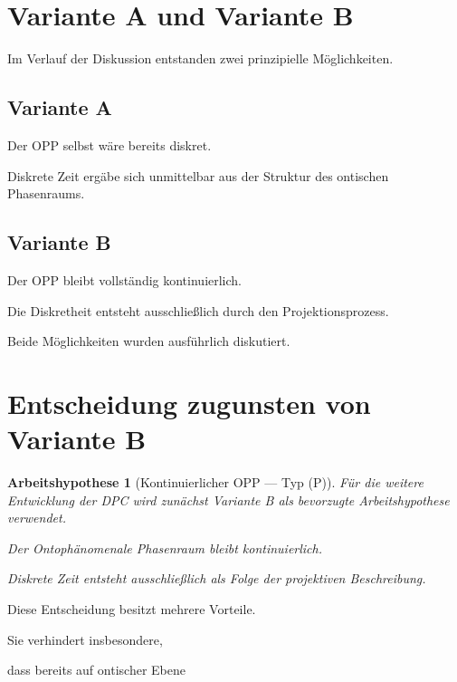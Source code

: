 \documentclass[11pt,a4paper]{article}
\newtheorem{hypothesis}{Arbeitshypothese}
\begin{document}
\section{Variante A und Variante B}

Im Verlauf der Diskussion entstanden zwei prinzipielle
Möglichkeiten.

\subsection*{Variante A}

Der OPP selbst wäre bereits diskret.

Diskrete Zeit ergäbe sich unmittelbar aus der Struktur
des ontischen Phasenraums.

\subsection*{Variante B}

Der OPP bleibt vollständig kontinuierlich.

Die Diskretheit entsteht ausschließlich durch den
Projektionsprozess.

Beide Möglichkeiten wurden ausführlich diskutiert.

\section{Entscheidung zugunsten von Variante B}

\begin{hypothesis}[Kontinuierlicher OPP --- Typ (P)]

Für die weitere Entwicklung der DPC wird zunächst
Variante B als bevorzugte Arbeitshypothese verwendet.

Der Ontophänomenale Phasenraum bleibt kontinuierlich.

Diskrete Zeit entsteht ausschließlich als Folge der
projektiven Beschreibung.

\end{hypothesis}

Diese Entscheidung besitzt mehrere Vorteile.

Sie verhindert insbesondere,

dass bereits auf ontischer Ebene
\end{document}
